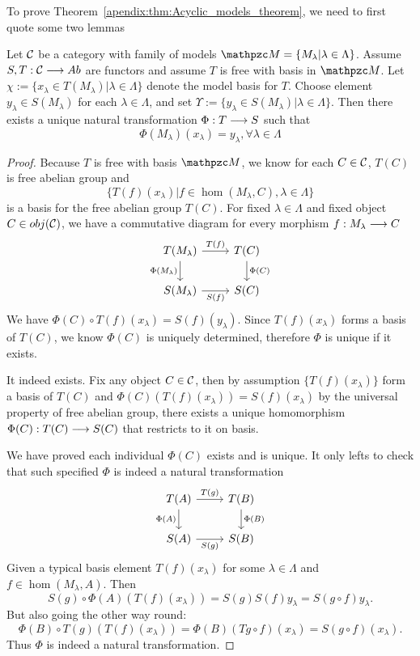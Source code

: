 \documentclass[11pt]{book} %
\begin{document}
To prove Theorem~\ref{apendix:thm:Acyclic_models_theorem}, we need to first quote some two lemmas
\begin{lemma}\label{apendixA:lem:A.1.3}
Let ${\cal C}$ be a category with family of models $\pzm=\{M_\lambda|\lambda\in \Lambda\}$. Assume $S,T:{\cal C}\longrightarrow Ab$ are functors and assume $T$ is free with basis in $\pzm$. Let
$\chi:=\{x_\lambda\in T(M_\lambda)|\lambda\in \Lambda\}$ denote the model basis for $T$. Choose element $y_\lambda\in S(M_\lambda)$ for each $\lambda\in \Lambda$, and set $\Upsilon:=\{y_\lambda\in S(M_\lambda)|\lambda\in\Lambda\}$. Then there exists a unique natural transformation $\Phi:T\longrightarrow S$ such that 
$$
\Phi(M_\lambda)(x_\lambda)=y_\lambda,\forall \lambda\in \Lambda
$$
\end{lemma}
\begin{proof}
Because $T$ is free with basis $\pzm$, we know for each $C\in{\cal C}$, $T(C)$ is free abelian group and
$$
\{T(f)(x_\lambda)|f\in \hom(M_\lambda,C), \lambda\in \Lambda\}
$$
is a basis for the free abelian group $T(C)$. For fixed $\lambda\in \Lambda$ and fixed object $C\in obj({\cal C})$, we have a commutative diagram for every morphism $f: M_\lambda\longrightarrow C$
\[
\begin{tikzcd}
T(M_\lambda) \arrow[r, "T(f)"] \arrow[d, "\Phi(M_\lambda)"'] & T(C) \arrow[d, "\Phi(C)"] \\
S(M_\lambda) \arrow[r, "S(f)"'] & S(C)
\end{tikzcd}
\]
We have $\Phi(C)\circ T(f)(x_\lambda)=S(f)(y_\lambda)$. Since $T(f)(x_\lambda)$ forms a basis of $T(C)$, we know $\Phi(C)$ is uniquely determined, therefore $\Phi$ is unique if it exists.

It indeed exists. Fix any object $C\in {\cal C}$, then by assumption $\{T(f)(x_\lambda)\}$ form a basis of $T(C)$ and $\Phi(C)(T(f)(x_\lambda))=S(f)(x_\lambda)$ by the universal property of free abelian group, there exists a unique homomorphism $\Phi(C):T(C)\longrightarrow S(C)$ that restricts to it on basis. 

We have proved each individual $\Phi(C)$ exists and is unique. It only lefts to check that such specified $\Phi$ is indeed a natural transformation
\[
\begin{tikzcd}
T(A) \arrow[r, "T(g)"] \arrow[d, "\Phi(A)"'] & T(B) \arrow[d, "\Phi(B)"] \\
S(A) \arrow[r, "S(g)"'] & S(B)
\end{tikzcd}
\]
Given a typical basis element $T(f)(x_\lambda)$ for some $\lambda\in \Lambda$ and $f\in \hom(M_\lambda,A)$. Then 
$$
S(g)\circ \Phi(A)(T(f)(x_\lambda))=S(g)S(f)y_\lambda=S(g\circ f) y_\lambda.
$$
But also going the other way round:
$$
\Phi(B)\circ T(g) (T(f)(x_\lambda))=\Phi(B)(Tg\circ f)(x_\lambda)=S(g\circ f)(x_\lambda).
$$
Thus  $\Phi$ is indeed a natural transformation.
\end{proof}
\end{document}
